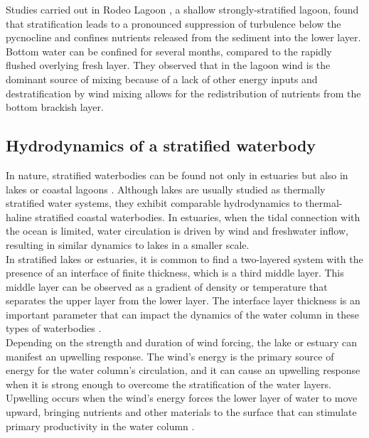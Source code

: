 \documentclass[tesis.tex]{subfiles}
\begin{document}
Studies carried out in Rodeo Lagoon \citep{Cousins2010}, a shallow strongly-stratified lagoon, found that stratification leads to a pronounced suppression of turbulence below the pycnocline and confines nutrients released from the sediment into the lower layer. Bottom water can be confined for several months, compared to the rapidly flushed overlying fresh layer. They observed that in the lagoon wind is the dominant source of mixing because of a lack of other energy inputs and destratification by wind mixing allows for the redistribution of nutrients from the bottom brackish layer.\\

\subsection{Hydrodynamics of a stratified waterbody}

In nature, stratified waterbodies can be found not only in estuaries \citep{human2016} but also in lakes \citep{Valerio2012, Imam2013, Coman2012} or coastal lagoons \citep{Cousins2010}. Although lakes are usually studied as thermally stratified water systems, they exhibit comparable hydrodynamics to thermal-haline stratified coastal waterbodies. In estuaries, when the tidal connection with the ocean is limited, water circulation is driven by wind and freshwater inflow, resulting in similar dynamics to lakes in a smaller scale. \\

In stratified lakes or estuaries, it is common to find a two-layered system with the presence of an interface of finite thickness, which is a third middle layer. This middle layer can be observed as a gradient of density or temperature that separates the upper layer from the lower layer. The interface layer thickness is an important parameter that can impact the dynamics of the water column in these types of waterbodies \citep{simpson1974fronts}.\\

Depending on the strength and duration of wind forcing, the lake or estuary can manifest an upwelling response. The wind's energy is the primary source of energy for the water column's circulation, and it can cause an upwelling response when it is strong enough to overcome the stratification of the water layers. Upwelling occurs when the wind's energy forces the lower layer of water to move upward, bringing nutrients and other materials to the surface that can stimulate primary productivity in the water column \citep{macintyre2010ecosystem}. \\
\end{document}
